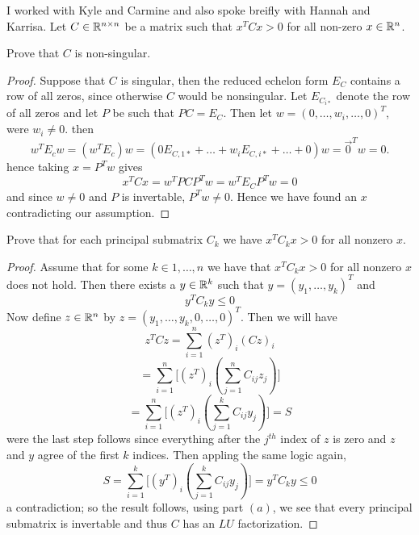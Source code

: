 



\maketitle 

I worked with Kyle and Carmine and also spoke breifly with Hannah and Karrisa. 
\question 
Let $C \in \mathbb{R}^{n \times n}$ be a matrix such that $x^TCx>0$ for all non-zero $x \in \mathbb{R}^n$. 

\begin{alphaparts}
    \questionpart 
    Prove that $C$ is non-singular. 
    
    \begin{proof}
        Suppose that $C$ is singular, then the reduced echelon form $E_C$ contains a row of 
        all zeros, since otherwise $C$ would be nonsingular. Let $E_{C_{i \ast}}$ denote the row of all zeros and 
        let $P$ be such that $PC = E_C$. Then let $w = (0, \dots, w_i, \dots, 0)^T$, were $w_i \neq 0$. 
        then 
        \[w^T E_c w = (w^T E_c) w = (0 E_{C,1 \ast} + \dots + w_i E_{C,i \ast} + \dots + 0) w = \vec{0}^T w = 0.\] 
        hence taking $x = P^T w$ gives
        \[x^TCx = w^T P C P^Tw = w^T E_C P^Tw = 0 \]
        and since $w \neq 0$ and $P$ is invertable, $P^Tw \neq 0$. Hence we have found an $x$ contradicting our assumption. 
    \end{proof}

    \questionpart 
    Prove that for each principal submatrix $C_k$ we have $x^TC_kx> 0$ for all nonzero $x$. 

    \begin{proof}
        Assume that for some $k \in 1, \dots, n$ we have that $x^T C_k x >0 $ for all nonzero $x$ does not hold. 
        Then there exists a $y \in \mathbb{R}^k$ such that $y = (y_1, \dots, y_k)^T$ and 
        \[y^T C_k y \leq 0\]
        Now define $z \in \mathbb{R}^n$ by $z = (y_1, \dots, y_k, 0, \dots, 0)^T$. 
        Then we will have 
        \[z^T C z = \sum_{i = 1}^n (z^T)_i (Cz)_i\]
        \[= \sum_{i = 1}^n \Big[(z^T)_i \left(\sum_{j= 1}^n C_{ij}z_j\right)\Big]\]
        \[= \sum_{i = 1}^n \Big[(z^T)_i \left(\sum_{j = 1}^k C_{ij} y_j\right)\Big] = S\]
        were the last step follows since everything after the $j^{th}$ index of $z$ is zero and $z$ and $y$ agree of the first $k$ indices. Then appling the same logic again,
        \[S = \sum_{i = 1}^k \Big[(y^T)_i \left(\sum_{j = 1}^k C_{ij} y_j\right)\Big] = y^TC_ky \leq 0\]
        a contradiction; so the result follows, using part $(a)$, we see that every principal submatrix is invertable and thus $C$ has an $LU$ factorization.
    \end{proof}

\end{alphaparts}

